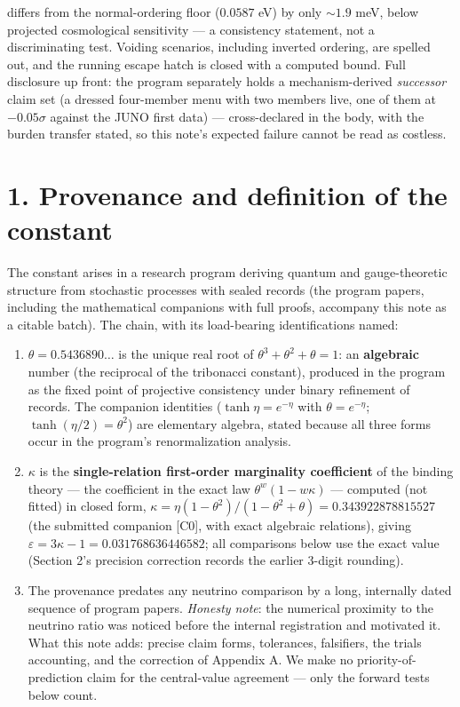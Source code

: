 \documentclass[11pt]{article}
\begin{document}
differs from the normal-ordering floor ($0.0587$ eV) by only $\sim 1.9$ meV, below projected cosmological sensitivity — a consistency statement, not a discriminating test.  Voiding scenarios, including inverted ordering, are spelled out, and the running escape hatch is closed with a computed bound.  Full disclosure up front: the program separately holds a mechanism-derived \emph{successor} claim set (a dressed four-member menu with two members live, one of them at $-0.05\sigma$ against the JUNO first data) — cross-declared in the body, with the burden transfer stated, so this note's expected failure cannot be read as costless.

\section*{1. Provenance and definition of the constant}
The constant arises in a research program deriving quantum and gauge-theoretic structure from stochastic processes with sealed records (the program papers, including the mathematical companions with full proofs, accompany this note as a citable batch).  The chain, with its load-bearing identifications named:

\begin{enumerate}
\item $\theta = 0.5436890\ldots$ is the unique real root of $\theta^3 + \theta^2 + \theta = 1$: an \textbf{algebraic} number (the reciprocal of the tribonacci constant), produced in the program as the fixed point of projective consistency under binary refinement of records.  The companion identities ($\tanh\eta = e^{-\eta}$ with $\theta = e^{-\eta}$; $\tanh(\eta/2) = \theta^2$) are elementary algebra, stated because all three forms occur in the program's renormalization analysis.
\item $\kappa$ is the \textbf{single-relation first-order marginality coefficient} of the binding theory — the coefficient in the exact law $\theta^w(1 - w\kappa)$ — computed (not fitted) in closed form, $\kappa = \eta(1-\theta^2)/(1-\theta^2+\theta) = 0.343922878815527$ (the submitted companion [C0], with exact algebraic relations), giving $\varepsilon = 3\kappa - 1 = 0.031768636446582$; all comparisons below use the exact value (Section 2's precision correction records the earlier 3-digit rounding).
\item The provenance predates any neutrino comparison by a long, internally dated sequence of program papers.  \emph{Honesty note}: the numerical proximity to the neutrino ratio was noticed before the internal registration and motivated it.  What this note adds: precise claim forms, tolerances, falsifiers, the trials accounting, and the correction of Appendix A.  We make no priority-of-prediction claim for the central-value agreement — only the forward tests below count.
\end{enumerate}
\end{document}
